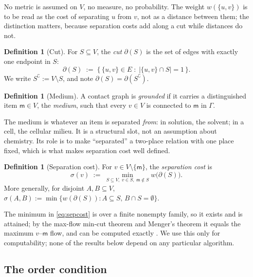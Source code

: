 \documentclass[11pt,twocolumn,a4paper]{article}
\theoremstyle{thmstyle}
\theoremstyle{definition}
\newtheorem{definition}[theorem]{Definition}
\theoremstyle{remark}
\newcommand{\Gph}{\Gamma}
\newcommand{\V}{V}
\newcommand{\E}{E}
\newcommand{\wt}{w}
\newcommand{\med}{\mathsf{m}}
\newcommand{\cut}{\partial}
\newcommand{\co}{\complement}
\newcommand{\str}{\sigma}
\newcommand{\abs}[1]{\lvert#1\rvert}
\begin{document}
No metric is assumed on $\V$, no measure, no probability. The weight
$\wt(\{u,v\})$ is to be read as the cost of separating $u$ from $v$,
not as a distance between them; the distinction matters, because
separation costs add along a cut while distances do not.

\begin{definition}[Cut]
\label{def:cut}
For $S \subseteq \V$, the \emph{cut} $\cut(S)$ is the set of edges with
exactly one endpoint in $S$:
\[
  \cut(S) \;:=\; \bigl\{\, \{u,v\} \in \E \;:\;
    \abs{\{u,v\} \cap S} = 1 \,\bigr\}.
\]
We write $S^\co := \V \setminus S$, and note $\cut(S) = \cut(S^\co)$.
\end{definition}

\begin{definition}[Medium]
\label{def:medium}
A contact graph is \emph{grounded} if it carries a distinguished item
$\med \in \V$, the \emph{medium}, such that every $v \in \V$ is
connected to $\med$ in $\Gph$.
\end{definition}

The medium is whatever an item is separated \emph{from}: in solution,
the solvent; in a cell, the cellular milieu. It is a structural slot,
not an assumption about chemistry. Its role is to make ``separated''
a two-place relation with one place fixed, which is what makes
separation cost well defined.

\begin{definition}[Separation cost]
\label{def:sepcost}
For $v \in \V \setminus \{\med\}$, the \emph{separation cost} is
\begin{equation}
  \str(v) \;:=\; \min_{S \subseteq \V,\; v \in S,\; \med \notin S}
    \wt\bigl(\cut(S)\bigr).
  \label{eq:sepcost}
\end{equation}
More generally, for disjoint $A, B \subseteq \V$,
$\str(A,B) := \min\{\wt(\cut(S)) : A \subseteq S,\, B \cap S =
\emptyset\}$.
\end{definition}

The minimum in \eqref{eq:sepcost} is over a finite nonempty family, so
it exists and is attained; by the max-flow min-cut theorem
\citep{fordfulkerson1956} and Menger's theorem \citep{menger1927} it
equals the maximum $v$--$\med$ flow, and can be computed exactly
\citep{stoer1997,karger1996}. We use this only for computability;
none of the results below depend on any particular algorithm.

\subsection{The order condition}
\end{document}
